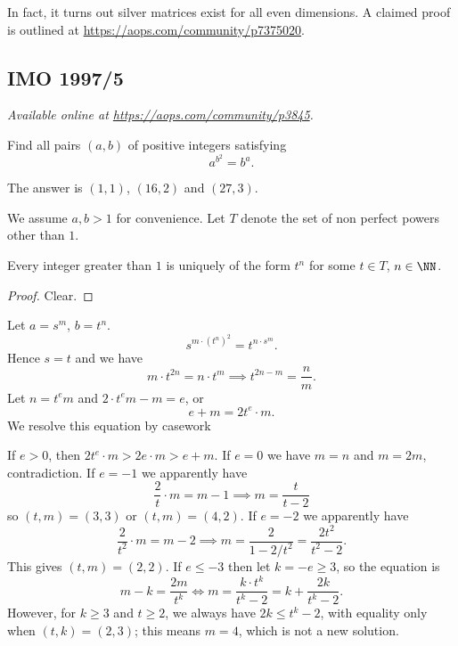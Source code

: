 \documentclass[11pt]{scrartcl}
\begin{document}
\begin{remark*}
  In fact, it turns out silver matrices exist for all even dimensions.
  A claimed proof is outlined at \url{https://aops.com/community/p7375020}.
\end{remark*}
\pagebreak

\subsection{IMO 1997/5}
\textsl{Available online at \url{https://aops.com/community/p3845}.}
\begin{mdframed}[style=mdpurplebox,frametitle={Problem statement}]
Find all pairs $(a,b)$ of positive integers satisfying
\[ a^{b^2} = b^a. \]
\end{mdframed}
The answer is $(1,1)$, $(16,2)$ and $(27,3)$.

We assume $a,b > 1$ for convenience.
Let $T$ denote the set of non perfect powers other than $1$.
\begin{claim*}
Every integer greater than $1$
is uniquely of the form $t^n$ for some $t \in T$, $n \in \NN$.
\end{claim*}
\begin{proof}
  Clear.
\end{proof}

Let $a = s^m$, $b = t^n$.
\[ s^{m \cdot (t^n)^2} = t^{n \cdot s^m}. \]
Hence $s = t$ and we have
\[ m \cdot t^{2n} = n \cdot t^m
  \implies t^{2n-m} = \frac nm. \]
Let $n = t^e m$ and $2 \cdot t^e m - m = e$, or
\[ e + m = 2t^e \cdot m. \]
We resolve this equation by casework
\begin{itemize}
  \ii If $e > 0$, then $2t^e \cdot m > 2e \cdot m > e+m$.
  \ii If $e=0$ we have $m=n$ and $m = 2m$, contradiction.
  \ii If $e = -1$ we apparently have
  \[ \frac{2}{t} \cdot m = m-1 \implies
    m = \frac{t}{t-2} \]
  so $(t,m) = (3,3)$ or $(t,m) = (4,2)$.
  \ii If $e = -2$ we apparently have
  \[ \frac{2}{t^2} \cdot m = m - 2
    \implies m = \frac{2}{1 - 2/t^2} = \frac{2t^2}{t^2-2}. \]
  This gives $(t,m) = (2,2)$.
  \ii If $e \le -3$ then let $k = -e \ge 3$, so the equation is
  \[ m-k = \frac{2m}{t^k}
  \iff m = \frac{k \cdot t^k}{t^k-2}
    = k + \frac{2k}{t^k-2}. \]
  However, for $k \ge 3$ and $t \ge 2$,
  we always have $2k \le t^k - 2$,
  with equality only when $(t,k) = (2,3)$;
  this means $m=4$, which is not a new solution.
\end{itemize}
\pagebreak
\end{document}
